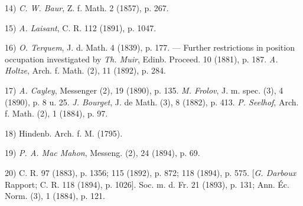 \vspace{-0.1cm}
\leftline{\rule{2in}{0.4pt}}
\vspace{0.1cm}
{
\footnotesize
14) \textit{C. W. Baur}, Z. f. Math. 2 (1857), p. 267.

15) \textit{A. Laisant}, C. R. 112 (1891), p. 1047.

16) \textit{O. Terquem}, J. d. Math. 4 (1839), p. 177. — Further restrictions in position occupation investigated by \textit{Th. Muir}, Edinb. Proceed. 10 (1881), p. 187. \textit{A. Holtze}, Arch. f. Math. (2), 11 (1892), p. 284.

17) \textit{A. Cayley}, Messenger (2), 19 (1890), p. 135. \textit{M. Frolov}, J. m. spec. (3), 4 (1890), p. 8 u. 25. \textit{J. Bourget}, J. de Math. (3), 8 (1882), p. 413. \textit{P. Seelhof}, Arch. f. Math. (2), 1 (1884), p. 97.

18) Hindenb. Arch. f. M. (1795).

19) \textit{P. A. Mac Mahon}, Messeng. (2), 24 (1894), p. 69.

20) C. R. 97 (1883), p. 1356; 115 (1892), p. 872; 118 (1894), p. 575. [\textit{G. Darboux} Rapport; C. R. 118 (1894), p. 1026]. Soc. m. d. Fr. 21 (1893), p. 131; Ann. Éc. Norm. (3), 1 (1884), p. 121.

}
